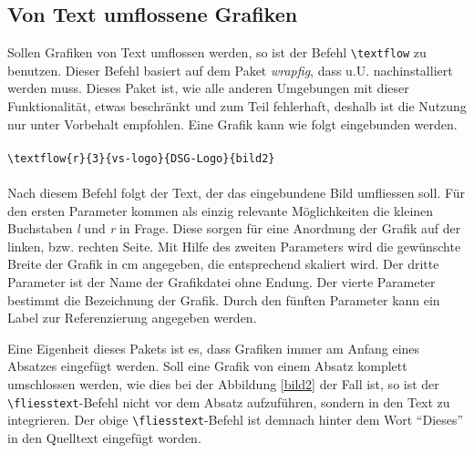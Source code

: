 \subsection{Von Text umflossene Grafiken}
%
Sollen Grafiken von Text umflossen werden, so ist der Befehl
\texttt{\textbackslash textflow} zu benutzen. Dieser Befehl basiert auf dem Paket
\emph{wrapfig}, dass u.U. nachinstalliert werden muss. Dieses
Paket ist, wie alle anderen Umgebungen mit dieser Funktionalität, etwas
beschränkt und zum Teil fehlerhaft, deshalb ist die Nutzung nur unter Vorbehalt
empfohlen. Eine Grafik kann wie folgt eingebunden werden.\\\\
\verb+\textflow{r}{3}{vs-logo}{DSG-Logo}{bild2}+\\\\
Nach diesem Befehl folgt der Text, der das eingebundene Bild umfliessen
soll. Für den ersten Parameter kommen als einzig relevante Möglichkeiten die
kleinen Buchstaben \emph{l} und \emph{r} in Frage. Diese sorgen für eine
Anordnung der Grafik auf der linken, bzw. rechten Seite. Mit Hilfe des zweiten
Parameters wird die gewünschte Breite der Grafik in cm angegeben, die
entsprechend skaliert wird. Der dritte Parameter ist der Name der Grafikdatei
ohne Endung. Der vierte Parameter bestimmt die Bezeichnung der Grafik. Durch den
fünften Parameter kann ein Label zur Referenzierung angegeben werden.

Eine Eigenheit dieses Pakets ist es, dass Grafiken immer am Anfang eines
Absatzes eingefügt werden. Soll eine Grafik von einem Absatz komplett
umschlossen werden, wie dies bei der Abbildung \ref{bild2} der Fall ist, so ist
der \texttt{\textbackslash fliesstext}-Befehl nicht vor dem Absatz aufzuführen, sondern in
den Text zu integrieren. Der obige \texttt{\textbackslash fliesstext}-Befehl ist demnach
hinter dem Wort "`Dieses"' in den Quelltext eingefügt worden.
%